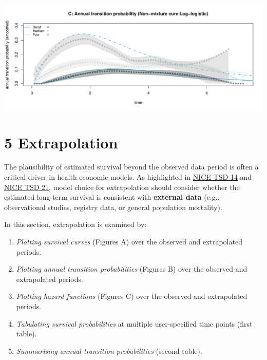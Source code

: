 \documentclass[
]{article}
\providecommand{\tightlist}{%
  \setlength{\itemsep}{0pt}\setlength{\parskip}{0pt}}
\begin{document}
\begin{flushleft}\includegraphics[height=0.25\textheight]{BC_OS_output/Images/Figure_cure_models-18} \end{flushleft}

\clearpage

\section{5 Extrapolation}\label{extrapolation}

The plausibility of estimated survival beyond the observed data period
is often a critical driver in health economic models. As highlighted in
\href{https://nicedsu.org.uk/wp-content/uploads/2016/03/NICE-DSU-TSD-Survival-analysis.updated-March-2013.v2.pdf}{NICE
TSD 14} and \href{https://www.sheffield.ac.uk/media/34188/download}{NICE
TSD 21}, model choice for extrapolation should consider whether the
estimated long-term survival is consistent with \textbf{external data}
(e.g., observational studies, registry data, or general population
mortality).

In this section, extrapolation is examined by:

\begin{enumerate}
\def\labelenumi{\arabic{enumi}.}
\tightlist
\item
  \emph{Plotting survival curves} (Figures A) over the observed and
  extrapolated periods.\\
\item
  \emph{Plotting annual transition probabilities} (Figures B) over the
  observed and extrapolated periods.
\item
  \emph{Plotting hazard functions} (Figures C) over the observed and
  extrapolated periods.
\item
  \emph{Tabulating survival probabilities} at multiple user-specified
  time points (first table).
\item
  \emph{Summarising annual transition probabilities} (second table).
\end{enumerate}
\end{document}
